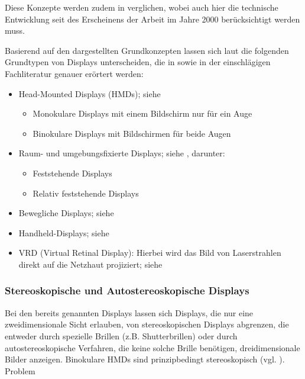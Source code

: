 \documentclass[pdftex,a4paper,titlepage,12pt]{scrartcl}
\newtheorem[L]{boxedDefinition}{Definition}
\begin{document}
Diese Konzepte werden zudem in \cite{Rolland2000} verglichen, wobei auch hier die technische Entwicklung seit des Erscheinens der Arbeit im Jahre 2000 berücksichtigt werden muss.

Basierend auf den dargestellten Grundkonzepten lassen sich laut \cite[Kapitel 2.2, Seite 22-30]{Toe2010} die folgenden Grundtypen von Displays unterscheiden, die in \cite{Toe2010} sowie in der einschlägigen Fachliteratur genauer erörtert werden:
 \begin{itemize}
 \item Head-Mounted Displays (HMDs); siehe \cite[Kapitel 2.2.1, Seite 23-25]{Toe2010}
 \begin{itemize}
  \item Monokulare Displays mit einem Bildschirm nur für ein Auge
  \item Binokulare Displays mit Bildschirmen für beide Augen
 \end{itemize}
 \item Raum- und umgebungsfixierte Displays; siehe \cite[Kapitel 2.2.2, Seite 25-28]{Toe2010}, darunter:
 \begin{itemize}
    \item Feststehende Displays
    \item Relativ feststehende Displays
 \end{itemize}
 \item Bewegliche Displays; siehe \cite[Kapitel 2.2.3, Seite 28]{Toe2010}
 \item Handheld-Displays; siehe \cite[Kapitel 2.2.4, Seite 28f.]{Toe2010}
 \item VRD (Virtual Retinal Display): Hierbei wird das Bild von Laserstrahlen direkt auf die Netzhaut projiziert; siehe \cite[Kapitel 3.1.2, Seite 5f.]{Suthau2002DE}
\end{itemize}

\subsubsection{Stereoskopische und Autostereoskopische Displays}
Bei den bereits genannten Displays lassen sich Displays, die nur eine zweidimensionale Sicht erlauben, von stereoskopischen Displays abgrenzen, die entweder durch spezielle Brillen (z.B. Shutterbrillen) oder durch autostereoskopische Verfahren, die keine solche Brille benötigen, dreidimensionale Bilder anzeigen. Binokulare HMDs sind prinzipbedingt stereoskopisch (vgl. \cite[Kapitel 2.2.1, Seite 23-25]{Toe2010}). Problem
\end{document}
